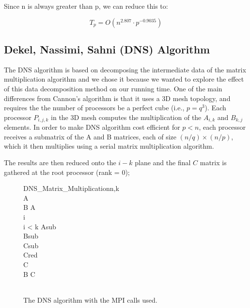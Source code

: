 \documentclass{article}
\begin{document}
Since n is always greater than p, we can reduce this to:

$$	T_p = O(n^{2.807} \cdot  p^{-0.9035})$$




\subsection{Dekel, Nassimi, Sahni (DNS) Algorithm}

The DNS algorithm is based on decomposing the intermediate data of the matrix
multiplication algorithm and we chose it because we wanted to explore the effect
of this data decomposition method on our running time. One of the main
differences from Cannon's algorithm is that it uses a 3D mesh topology, and
requires the the number of processors be a perfect cube (i.e., $p = q^3$). Each
processor $P_{i,j,k}$ in the 3D mesh computes the multiplication of the
$A_{i,k}$ and $B_{k,j}$ elements.  In order to make DNS algorithm cost efficient
for $p < n$, each processor receives a submatrix of the A and B matrices, each
of size $(n/q) \times (n/p)$, which it then multiplies using a serial matrix
multiplication algorithm.

The results are then reduced onto the $i-k$ plane and the final $C$ matrix is
gathered at the root processor (rank = 0);

\begin{figure}

\begin{pseudocode}[ruled]{DNS\_Matrix\_Multiplication}{n,k}
 \\
A \GETS {} \\
B \GETS A \\
i  \\

\WHILE i < k \DO
\BEGIN
	Asub \GETS {} \\
	Bsub \GETS {} \\
	Csub \GETS {} \\
	
	Cred \GETS {} \\
	C \GETS {} \\

	B \GETS C \\
\END \vspace{10pt} \\

\end{pseudocode}
\caption{The DNS algorithm with the MPI calls used.}
\end{figure}
\end{document}
